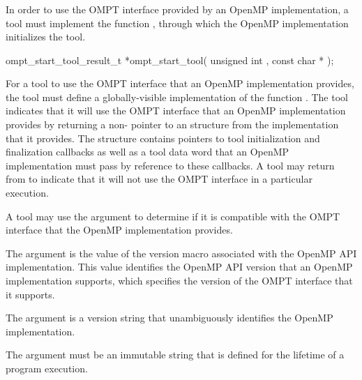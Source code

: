 \subsubsection{}
\label{sec:ompt_start_tool}

\summary
In order to use the OMPT interface provided by an OpenMP implementation,
a tool must implement the function , through which 
the OpenMP implementation initializes the tool.

\format
\begin{cspecific}
\begin{omptOther}
ompt_start_tool_result_t *ompt_start_tool(
  unsigned int ,
  const char *
);
\end{omptOther}
\end{cspecific}


\descr
For a tool to use the OMPT interface that an OpenMP implementation provides,
the tool must define a globally-visible implementation of the
function . The tool indicates that it will use the OMPT 
interface that an OpenMP implementation provides by returning a non- 
pointer to an  structure from the 
 implementation that it provides. The 
 structure contains pointers to tool initialization 
and finalization callbacks as well as a tool data word that an OpenMP implementation 
must pass by reference to these callbacks. A tool may return  from 
 to indicate that it will not use the OMPT interface in 
a particular execution.

A tool may use the  argument to determine if it is compatible with 
the OMPT interface that the OpenMP implementation provides.

\argdesc

The argument  is the value of the  version macro
associated with the OpenMP API implementation. This value identifies the OpenMP 
API version that an OpenMP implementation supports, which specifies the version 
of the OMPT interface that it supports.

The argument  is a version string that unambiguously 
identifies the OpenMP implementation.

\constraints

The argument  must be an immutable string that is defined 
for the lifetime of a program execution.

